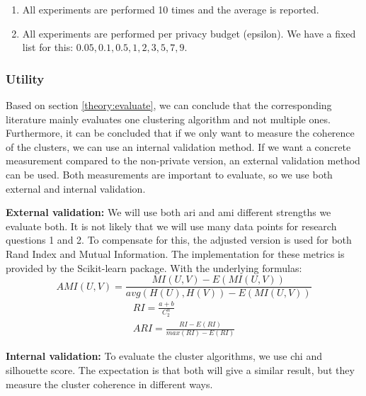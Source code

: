 \begin{enumerate}
  \item All experiments are performed 10 times and the average is reported.
  \item All experiments are performed per privacy budget (epsilon).
        We have a fixed list for this: ${0.05, 0.1, 0.5, 1, 2, 3, 5, 7, 9}$.
\end{enumerate}

\subsubsection{Utility}
Based on section \ref{theory:evaluate}, we can conclude that the corresponding literature mainly evaluates one clustering algorithm and not multiple ones.
Furthermore, it can be concluded that if we only want to measure the coherence of the clusters, we can use an internal validation method. If we want a concrete measurement compared to the non-private version, an external validation method can be used.
Both measurements are important to evaluate, so we use both external and internal validation. \newline

\textbf{External validation:}
We will use both \gls{ari} and \gls{ami} different strengths we evaluate both.
It is not likely that we will use many data points for research questions 1 and 2.
To compensate for this, the adjusted version is used for both Rand Index and Mutual Information.
The implementation for these metrics is provided by the Scikit-learn package.
With the underlying formulas:
\begin{equation}
  AMI(U, V) = \frac{MI(U, V) - E(MI(U, V))}{avg(H(U), H(V)) - E(MI(U, V))}
\end{equation}
\begin{gather}
  RI = \frac{a + b}{C^{n}_{2}} \\
  ARI = \frac{RI - E(RI)}{max(RI) - E(RI)}
\end{gather}

\textbf{Internal validation:}
To evaluate the cluster algorithms, we use \gls{chi} and silhouette score.
The expectation is that both will give a similar result, but they measure the cluster coherence in different ways.


